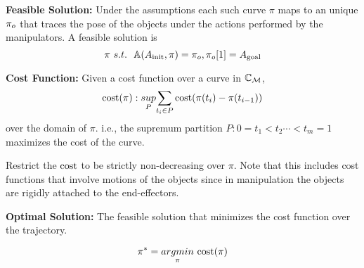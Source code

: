 \noindent \textbf{Feasible Solution:} Under the assumptions each such curve $\pi$ maps to an unique $\pi_{o}$ that traces the pose of the objects under the actions performed by the manipulators. A feasible solution is 
$$\pi\ s.t.\ \ \objectmotion(\ainit, \pi) = \pi_o, \pi_o[1] = \atarget$$

\noindent \textbf{Cost Function:} Given a cost function over a curve in $\mathbb{C}_{\mathcal{M}}$, 
$$\textup{cost}(\pi) : \underset{P}{sup} { \sum_{t_i\in P} \textup{cost}( \pi(t_i) - \pi(t_{i-1}) ) } $$ over the domain of $\pi$.
i.e., the supremum partition $P : 0=t_1<t_2\cdots<t_m=1$ maximizes the cost of the curve.

Restrict the $\textup{cost}$ to be strictly non-decreasing over $\pi$. Note that this includes cost functions that involve motions of the objects since in manipulation the objects are rigidly attached to the end-effectors.

\noindent \textbf{Optimal Solution: } The feasible solution that minimizes the cost function over the trajectory. 

$$ \pi^* = \underset{\pi}{argmin} {\ \cost(\pi)}$$

